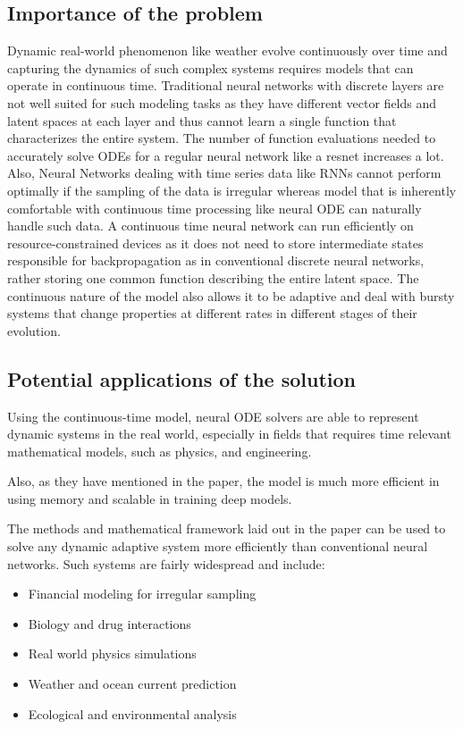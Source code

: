 \documentclass{article}
\begin{document}
\subsection{Importance of the problem}
Dynamic real-world phenomenon like weather evolve continuously over time and capturing the dynamics of such complex systems requires models that can operate in continuous time. Traditional neural networks with discrete layers are not well suited for such modeling tasks as they have different vector fields and latent spaces at each layer and thus cannot learn a single function that characterizes the entire system. The number of function evaluations needed to accurately solve ODEs for a regular neural network like a resnet increases a lot. Also, Neural Networks dealing with time series data like RNNs cannot perform optimally if the sampling of the data is irregular whereas model that is inherently comfortable with continuous time processing like neural ODE can naturally handle such data. A continuous time neural network can run efficiently on resource-constrained devices as it does not need to store intermediate states responsible for backpropagation as in conventional discrete neural networks, rather storing one common function describing the entire latent space. The continuous nature of the model also allows it to be adaptive and deal with bursty systems that change properties at different rates in different stages of their evolution.
\subsection{Potential applications of the solution}
Using the continuous-time model, neural ODE solvers are able to represent dynamic systems in the real world, especially in fields that requires time relevant mathematical models, such as physics, and engineering.

Also, as they have mentioned in the paper, the model is much more efficient in using memory and scalable in training deep models.

The methods and mathematical framework laid out in the paper can be used to solve any dynamic adaptive system more efficiently than conventional neural networks. Such systems are fairly widespread and include:

\begin{itemize}
    \item Financial modeling for irregular sampling
    \item Biology and drug interactions
    \item Real world physics simulations
    \item Weather and ocean current prediction
    \item Ecological and environmental analysis
\end{itemize}
\end{document}
